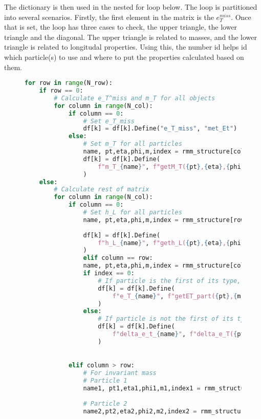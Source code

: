 The dictionary is then used in the nested for loop below. The loop is partitioned into several 
scenarios. Firstly, the first element in the matrix is the $e_T^{miss}$. Once that is set, 
the loop has three cases to check, the upper triangle, the lower triangle and the diagonal. 
The upper triangle is related to masses, and the lower triangle is related to longitudal properties. 
Using this, the number id helps id which particle(s) to use and where to put the properties 
calculated based on them.

\begin{figure}[H]
\begin{lstlisting}[language=Python, style=pythonstyle, label={code:RMM_implementation}]
for row in range(N_row):
    if row == 0:
        # Calculate e_T^miss and m_T for all objects
        for column in range(N_col):
            if column == 0:
                # Set e_T_miss
                df[k] = df[k].Define("e_T_miss", "met_Et") 
            else:
                # Set m_T for all particles
                name, pt,eta,phi,m,index = rmm_structure[column]
                df[k] = df[k].Define(
                    f"m_T_{name}", f"getM_T({pt},{eta},{phi},{m},{index})"
                )
    else:
        # Calculate rest of matrix
        for column in range(N_col):
            if column == 0:
                # Set h_L for all particles
                name, pt,eta,phi,m,index = rmm_structure[row]
                
                df[k] = df[k].Define(
                    f"h_L_{name}", f"geth_L({pt},{eta},{phi},{m},{index})"
                )
                elif column == row:
                name, pt,eta,phi,m,index = rmm_structure[column]
                if index == 0:
                    # If particle is the first of its type, calculate e_T of particle
                    df[k] = df[k].Define(
                        f"e_T_{name}", f"getET_part({pt},{m},{index})"
                    )
                else:
                    # If particle is not the first of its type, calculate the difference in e_T
                    df[k] = df[k].Define(
                        f"delta_e_t_{name}", f"delta_e_T({pt},{m},{index})"
                    )
                    

            elif column > row:
                # For invariant mass
                # Particle 1
                name1, pt1,eta1,phi1,m1,index1 = rmm_structure[row]
                
                # Particle 2
                name2,pt2,eta2,phi2,m2,index2 = rmm_structure[column]
        

\end{lstlisting}
\end{figure}
